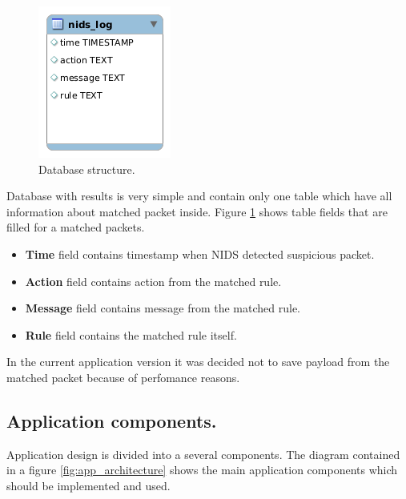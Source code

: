 \documentclass[thesis=M,english]{FITthesis}[2011/07/15]
\begin{document}
\begin{figure}[h]
\centering
\includegraphics[scale=0.55]{images/database.png}
\caption{Database structure.}
\label{fig:database_structure}
\end{figure}

Database with results is very simple and contain only one table which have all information about matched packet inside. Figure \ref{fig:database_structure} shows table fields that are filled for a matched packets.
\begin{itemize}
\item \textbf{Time} field contains timestamp when NIDS detected suspicious packet.
\item \textbf{Action} field contains action from the matched rule.
\item \textbf{Message} field contains message from the matched rule.
\item \textbf{Rule} field contains the matched rule itself.
\end{itemize}
In the current application version it was decided not to save payload from the matched packet because of perfomance reasons.

\subsection*{Application components.}
Application design is divided into a several components. The diagram contained in a figure \ref{fig:app_architecture} shows the main application components which should be implemented and used.
\end{document}
